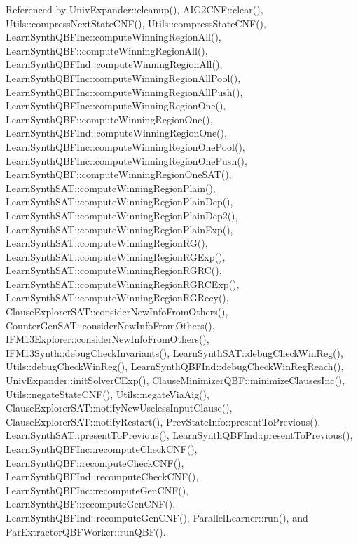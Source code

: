 Referenced by Univ\-Expander\-::cleanup(), A\-I\-G2\-C\-N\-F\-::clear(), Utils\-::compress\-Next\-State\-C\-N\-F(), Utils\-::compress\-State\-C\-N\-F(), Learn\-Synth\-Q\-B\-F\-Inc\-::compute\-Winning\-Region\-All(), Learn\-Synth\-Q\-B\-F\-::compute\-Winning\-Region\-All(), Learn\-Synth\-Q\-B\-F\-Ind\-::compute\-Winning\-Region\-All(), Learn\-Synth\-Q\-B\-F\-Inc\-::compute\-Winning\-Region\-All\-Pool(), Learn\-Synth\-Q\-B\-F\-Inc\-::compute\-Winning\-Region\-All\-Push(), Learn\-Synth\-Q\-B\-F\-Inc\-::compute\-Winning\-Region\-One(), Learn\-Synth\-Q\-B\-F\-::compute\-Winning\-Region\-One(), Learn\-Synth\-Q\-B\-F\-Ind\-::compute\-Winning\-Region\-One(), Learn\-Synth\-Q\-B\-F\-Inc\-::compute\-Winning\-Region\-One\-Pool(), Learn\-Synth\-Q\-B\-F\-Inc\-::compute\-Winning\-Region\-One\-Push(), Learn\-Synth\-Q\-B\-F\-::compute\-Winning\-Region\-One\-S\-A\-T(), Learn\-Synth\-S\-A\-T\-::compute\-Winning\-Region\-Plain(), Learn\-Synth\-S\-A\-T\-::compute\-Winning\-Region\-Plain\-Dep(), Learn\-Synth\-S\-A\-T\-::compute\-Winning\-Region\-Plain\-Dep2(), Learn\-Synth\-S\-A\-T\-::compute\-Winning\-Region\-Plain\-Exp(), Learn\-Synth\-S\-A\-T\-::compute\-Winning\-Region\-R\-G(), Learn\-Synth\-S\-A\-T\-::compute\-Winning\-Region\-R\-G\-Exp(), Learn\-Synth\-S\-A\-T\-::compute\-Winning\-Region\-R\-G\-R\-C(), Learn\-Synth\-S\-A\-T\-::compute\-Winning\-Region\-R\-G\-R\-C\-Exp(), Learn\-Synth\-S\-A\-T\-::compute\-Winning\-Region\-R\-G\-Recy(), Clause\-Explorer\-S\-A\-T\-::consider\-New\-Info\-From\-Others(), Counter\-Gen\-S\-A\-T\-::consider\-New\-Info\-From\-Others(), I\-F\-M13\-Explorer\-::consider\-New\-Info\-From\-Others(), I\-F\-M13\-Synth\-::debug\-Check\-Invariants(), Learn\-Synth\-S\-A\-T\-::debug\-Check\-Win\-Reg(), Utils\-::debug\-Check\-Win\-Reg(), Learn\-Synth\-Q\-B\-F\-Ind\-::debug\-Check\-Win\-Reg\-Reach(), Univ\-Expander\-::init\-Solver\-C\-Exp(), Clause\-Minimizer\-Q\-B\-F\-::minimize\-Clauses\-Inc(), Utils\-::negate\-State\-C\-N\-F(), Utils\-::negate\-Via\-Aig(), Clause\-Explorer\-S\-A\-T\-::notify\-New\-Useless\-Input\-Clause(), Clause\-Explorer\-S\-A\-T\-::notify\-Restart(), Prev\-State\-Info\-::present\-To\-Previous(), Learn\-Synth\-S\-A\-T\-::present\-To\-Previous(), Learn\-Synth\-Q\-B\-F\-Ind\-::present\-To\-Previous(), Learn\-Synth\-Q\-B\-F\-Inc\-::recompute\-Check\-C\-N\-F(), Learn\-Synth\-Q\-B\-F\-::recompute\-Check\-C\-N\-F(), Learn\-Synth\-Q\-B\-F\-Ind\-::recompute\-Check\-C\-N\-F(), Learn\-Synth\-Q\-B\-F\-Inc\-::recompute\-Gen\-C\-N\-F(), Learn\-Synth\-Q\-B\-F\-::recompute\-Gen\-C\-N\-F(), Learn\-Synth\-Q\-B\-F\-Ind\-::recompute\-Gen\-C\-N\-F(), Parallel\-Learner\-::run(), and Par\-Extractor\-Q\-B\-F\-Worker\-::run\-Q\-B\-F().

